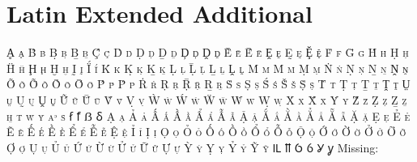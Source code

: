 

\presection\section*{\checkno Latin Extended Additional}\postsection

\textsc{Ḁ ḁ Ḃ ḃ Ḅ ḅ Ḇ ḇ Ḉ ḉ Ḋ ḋ Ḍ ḍ Ḏ ḏ
Ḑ ḑ Ḓ ḓ Ḕ ḕ Ḗ ḗ Ḙ ḙ Ḛ ḛ Ḝ ḝ Ḟ ḟ
Ḡ ḡ Ḣ ḣ Ḥ ḥ Ḧ ḧ Ḩ ḩ Ḫ ḫ Ḭ ḭ Ḯ ḯ
Ḱ ḱ Ḳ ḳ Ḵ ḵ Ḷ ḷ Ḹ ḹ Ḻ ḻ Ḽ ḽ Ḿ ḿ
Ṁ ṁ Ṃ ṃ Ṅ ṅ Ṇ ṇ Ṉ ṉ Ṋ ṋ Ṍ ṍ Ṏ ṏ
Ṑ ṑ Ṓ ṓ Ṕ ṕ Ṗ ṗ Ṙ ṙ Ṛ ṛ Ṝ ṝ Ṟ ṟ
Ṡ ṡ Ṣ ṣ Ṥ ṥ Ṧ ṧ Ṩ ṩ Ṫ ṫ Ṭ ṭ Ṯ ṯ
Ṱ ṱ Ṳ ṳ Ṵ ṵ Ṷ ṷ Ṹ ṹ Ṻ ṻ Ṽ ṽ Ṿ ṿ
Ẁ ẁ Ẃ ẃ Ẅ ẅ Ẇ ẇ Ẉ ẉ Ẋ ẋ Ẍ ẍ Ẏ ẏ
Ẑ ẑ Ẓ ẓ Ẕ ẕ ẖ ẗ ẘ ẙ ẚ ẛ ẜ ẝ ẞ ẟ
Ạ ạ Ả ả Ấ ấ Ầ ầ Ẩ ẩ Ẫ ẫ Ậ ậ Ắ ắ
Ằ ằ Ẳ ẳ Ẵ ẵ Ặ ặ Ẹ ẹ Ẻ ẻ Ẽ ẽ Ế ế
Ề ề Ể ể Ễ ễ Ệ ệ Ỉ ỉ Ị ị Ọ ọ Ỏ ỏ
Ố ố Ồ ồ Ổ ổ Ỗ ỗ Ộ ộ Ớ ớ Ờ ờ Ở ở
Ỡ ỡ Ợ ợ Ụ ụ Ủ ủ Ứ ứ Ừ ừ Ử ử Ữ ữ
Ự ự Ỳ ỳ Ỵ ỵ Ỷ ỷ Ỹ ỹ Ỻ ỻ Ỽ ỽ Ỿ ỿ}
\hfill Missing: 